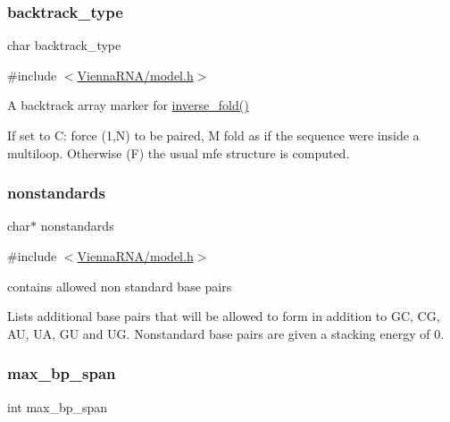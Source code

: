 \subsubsection{\texorpdfstring{backtrack\+\_\+type}{backtrack\_type}}
{\footnotesize\ttfamily char backtrack\+\_\+type}



{\ttfamily \#include $<$\mbox{\hyperlink{model_8h}{Vienna\+R\+N\+A/model.\+h}}$>$}



A backtrack array marker for \mbox{\hyperlink{group__inverse__fold_ga7af026de55d4babad879f2c92559cbbc}{inverse\+\_\+fold()}} 

If set to \textquotesingle{}C\textquotesingle{}\+: force (1,N) to be paired, \textquotesingle{}M\textquotesingle{} fold as if the sequence were inside a multiloop. Otherwise (\textquotesingle{}F\textquotesingle{}) the usual mfe structure is computed. \mbox{\label{group__model__details_ga2695d91cc535d09c2eae5c3884e2ec64}} 
\subsubsection{\texorpdfstring{nonstandards}{nonstandards}}
{\footnotesize\ttfamily char$\ast$ nonstandards}



{\ttfamily \#include $<$\mbox{\hyperlink{model_8h}{Vienna\+R\+N\+A/model.\+h}}$>$}



contains allowed non standard base pairs 

Lists additional base pairs that will be allowed to form in addition to GC, CG, AU, UA, GU and UG. Nonstandard base pairs are given a stacking energy of 0. \mbox{\label{group__model__details_ga18df869af0d70101106458fc3f027806}} 
\subsubsection{\texorpdfstring{max\+\_\+bp\+\_\+span}{max\_bp\_span}}
{\footnotesize\ttfamily int max\+\_\+bp\+\_\+span}



